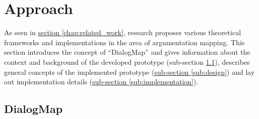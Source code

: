 \section{Approach}
\label{chap:approach}

As seen in \hyperref[chap:related_work]{section \ref{chap:related_work}}, research proposes various theoretical frameworks and implementations in the area of argumentation mapping. This section introduces the concept of ``DialogMap'' and gives information about the context and background of the developed prototype (sub-section \ref{sub:dialogmap}), describes general concepts of the implemented prototype (\hyperref[sub:design]{sub-section \ref{sub:design}}) and lay out implementation details (\hyperref[sub:implementation]{sub-section \ref{sub:implementation}}).

\subsection{DialogMap}
\label{sub:dialogmap}

